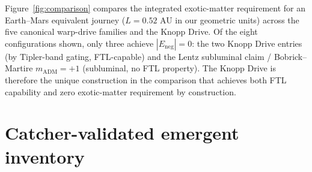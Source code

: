\documentclass[11pt,a4paper]{article}
\begin{document}
Figure~\ref{fig:comparison} compares the integrated exotic-matter requirement for an Earth--Mars equivalent journey ($L=0.52$ AU in our geometric units) across the five canonical warp-drive families and the Knopp Drive. Of the eight configurations shown, only three achieve $|E_{\mathrm{neg}}|=0$: the two Knopp Drive entries (by Tipler-band gating, FTL-capable) and the Lentz subluminal claim / Bobrick--Martire $m_{\mathrm{ADM}}=+1$ (subluminal, no FTL property). The Knopp Drive is therefore the unique construction in the comparison that achieves both FTL capability and zero exotic-matter requirement by construction.

\section{Catcher-validated emergent inventory}\label{sec:emergents}
\end{document}
